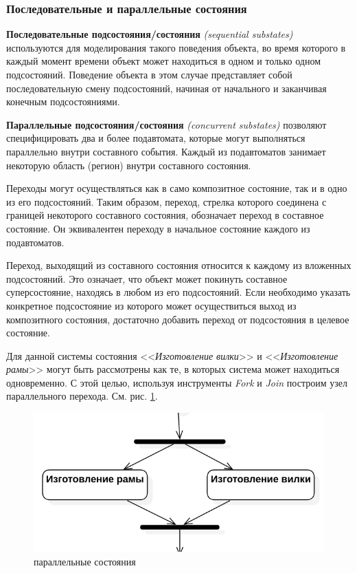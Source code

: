 \documentclass[a4paper,12pt]{extreport}
\begin{document}
\subsubsection*{Последовательные и параллельные состояния}

\textbf{Последовательные подсостояния/состояния} \textit{(sequential substates)} используются для моделирования такого поведения объекта, во время которого в каждый момент времени объект может находиться в одном и только одном подсостояний. Поведение объекта в этом случае представляет собой последовательную смену подсостояний, начиная от начального и заканчивая конечным подсостояниями.

\textbf{Параллельные подсостояния/состояния} \textit{(concurrent substates)} позволяют специфицировать два и более подавтомата, которые могут выполняться параллельно внутри составного события. Каждый из подавтоматов занимает некоторую область (регион) внутри составного состояния.

Переходы могут осуществляться как в само композитное состояние, так и в одно из его подсостояний. Таким образом, переход, стрелка которого соединена с границей некоторого составного состояния, обозначает переход в составное состояние. Он эквивалентен переходу в начальное состояние каждого из подавтоматов.

Переход, выходящий из составного состояния относится к каждому из вложенных подсостояний. Это означает, что объект может покинуть составное суперсостояние, находясь в любом из его подсостояний. Если необходимо указать конкретное подсостояние из которого может осуществиться выход из композитного состояния, достаточно добавить переход от подсостояния в целевое состояние.

Для данной системы состояния <<\textit{Изготовление вилки}>> и <<\textit{Изготовление рамы}>> могут быть рассмотрены как те, в которых система может находиться одновременно. С этой целью, используя инструменты \textit{Fork} и \textit{Join} построим узел параллельного перехода. См. рис. \ref{fig:statechartparallel}.
\begin{figure}[h!]
	\centering
	\includegraphics[width=0.5\linewidth]{images/statechartparallel}
	\caption{параллельные состояния}
	\label{fig:statechartparallel}
\end{figure}
\end{document}
